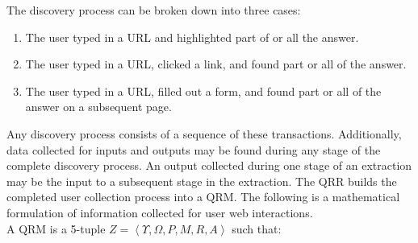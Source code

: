 \documentclass{www2010-submission}
\begin{document}
The discovery process can be broken down into three cases:
\begin{enumerate}
\item The user typed in a URL  and highlighted part of or all the answer. 
\item The user typed in a URL, clicked a link, and found part or all of the answer. 
\item The user typed in a URL, filled out a form, and found part or all of the answer on a subsequent page. 
\end{enumerate}

Any discovery process  consists of a sequence of these transactions.  Additionally, data collected for inputs and outputs may be found during any stage of the complete discovery process.  An output collected during one stage of an extraction may be the input to a subsequent stage in the extraction.  The QRR builds the completed user collection process into a QRM.  The following is a mathematical formulation of information collected for user web interactions.\\

A QRM is a 5-tuple $Z = \left< \Upsilon, \Omega, P, M, R, A \right>$ such that:
\end{document}
